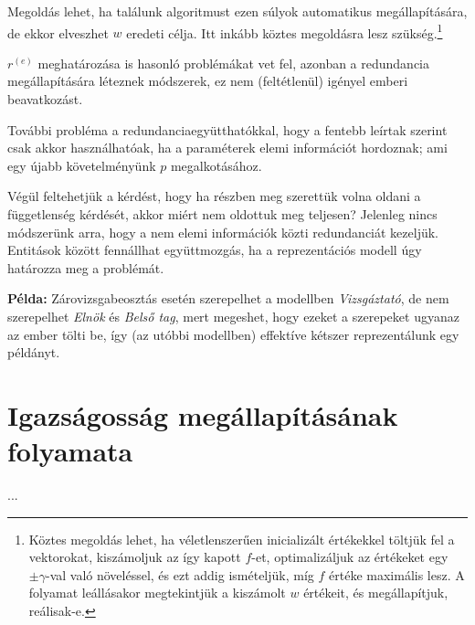 \documentclass{article}
\theoremstyle{definition}
\newcommand{\pl}{ \textbf{Példa:} }
\newcommand{\ent}[2]{ {#1}^{(#2)} }
\begin{document}
\begin{multicols}{2}
    Megoldás lehet, ha találunk algoritmust ezen súlyok automatikus megállapítására, de ekkor elveszhet $w$ eredeti célja. Itt inkább köztes megoldásra lesz szükség.\footnote{Köztes megoldás lehet, ha véletlenszerűen inicializált értékekkel töltjük fel a vektorokat, kiszámoljuk az így kapott $f$-et, optimalizáljuk az értékeket egy $\pm \gamma$-val való növeléssel, és ezt addig ismételjük, míg $f$ értéke maximális lesz. A folyamat leállásakor megtekintjük a kiszámolt $w$ értékeit, és megállapítjuk, reálisak-e.}
    
    $\ent r e$ meghatározása is hasonló problémákat vet fel, azonban a redundancia megállapítására léteznek módszerek, ez nem (feltétlenül) igényel emberi beavatkozást.
    
    További probléma a redundanciaegyütthatókkal, hogy a fentebb leírtak szerint csak akkor használhatóak, ha a paraméterek elemi információt hordoznak; ami egy újabb követelményünk $p$ megalkotásához.
    
    Végül feltehetjük a kérdést, hogy ha részben meg szerettük volna oldani a függetlenség kérdését, akkor miért nem oldottuk meg teljesen? Jelenleg nincs módszerünk arra, hogy a nem elemi információk közti redundanciát kezeljük. Entitások között fennállhat együttmozgás, ha a reprezentációs modell úgy határozza meg a problémát.
    
    \pl Zárovizsgabeosztás esetén szerepelhet a modellben \textit{Vizsgáztató}, de nem szerepelhet \textit{Elnök} és \textit{Belső tag}, mert megeshet, hogy ezeket a szerepeket ugyanaz az ember tölti be, így (az utóbbi modellben) effektíve kétszer reprezentálunk egy példányt.

\section{Igazságosság megállapításának folyamata}
    ...
    
\end{multicols}
\end{document}
